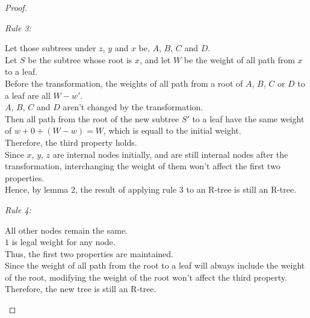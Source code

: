 \documentclass[10pt]{article}
\begin{document}
\begin{enumerate}
\begin{proof}
\begin{addmargin}[1em]{0em}
		\textit{Rule 3:}
		\begin{addmargin}[1em]{0em}
			Let those subtrees under $z$, $y$ and $x$ be, $A$, $B$, $C$ and
			$D$. \\
			Let $S$ be the subtree whose root is $x$, and let $W$ be the weight
			of all path from $x$ to a leaf. \\
			Before the transformation, the weights of all path from a root of
			$A$, $B$, $C$ or $D$ to a leaf are all $W - w'$. \\
			$A$, $B$, $C$ and $D$ aren't changed by the transformation. \\
			Then all path from the root of the new subtree $S'$ to a leaf have
			the same weight of $w +0+ (W-w) = W$, which is equall to the
			initial weight. \\
			Therefore, the third property holds. \\
			Since $x$, $y$, $z$ are internal nodes initially, and are still
			internal nodes after the transformation, interchanging the weight
			of them won't affect the first two properties. \\
			Hence, by lemma 2, the result of applying  rule 3 to an R-tree is
			still an R-tree.
		\end{addmargin}

		\textit{Rule 4:}
		\begin{addmargin}[1em]{0em}
			All other nodes remain the same. \\
			$1$ is legal weight for any node. \\
			Thus, the first two properties are maintained. \\
			Since the weight of all path from the root to a leaf will always
			include the weight of the root, modifying the weight of the root
			won't affect the third property. \\
			Therefore, the new tree is still an R-tree.
		\end{addmargin}


\end{addmargin}
\end{proof}
\end{enumerate}
\end{document}
